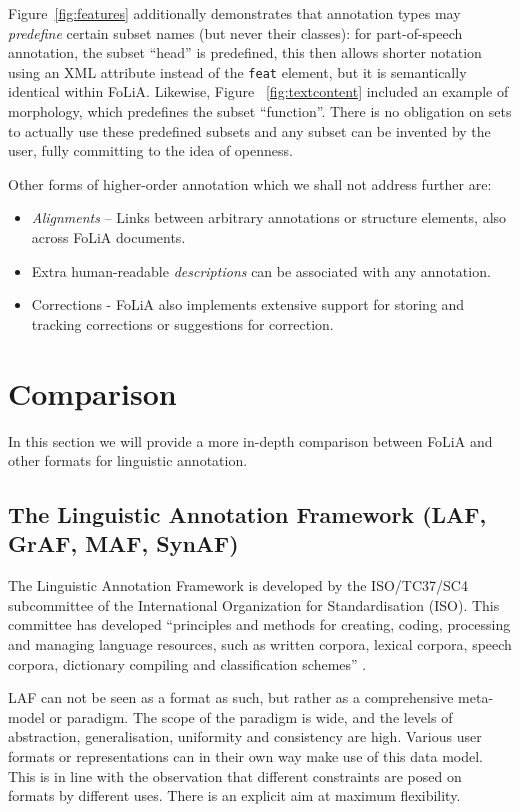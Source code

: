 \documentclass[a4paper,10pt,twoside]{article}
\begin{document}
Figure~\ref{fig:features} additionally demonstrates that annotation types may \emph{predefine} certain subset
names (but never their classes): for part-of-speech annotation, the subset ``head''
is predefined, this then allows shorter notation using an XML attribute instead
of the \texttt{feat} element, but it is semantically identical within FoLiA.  Likewise,
Figure~ \ref{fig:textcontent} included an example of morphology, which predefines
the subset ``function''. There is no obligation on sets to actually use these
predefined subsets and any subset can be invented by the user, fully committing
to the idea of openness. %

Other forms of higher-order annotation which we shall not address further are:

\begin{itemize}
  \item \emph{Alignments} -- Links \cite{XLINK} between arbitrary annotations or structure
elements, also across FoLiA documents.  
  \item Extra human-readable \emph{descriptions} can be associated with any annotation.
  \item Corrections - FoLiA also implements extensive support for storing and tracking
corrections or suggestions for correction.
\end{itemize}

\section{Comparison}
\label{sec:comparison}

In this section we will provide a more in-depth comparison between FoLiA and
other formats for linguistic annotation.

\subsection{The Linguistic Annotation Framework (LAF, GrAF, MAF, SynAF)}
\label{sec:LAF}

The Linguistic Annotation Framework is developed by the ISO/TC37/SC4
subcommittee of the International Organization for Standardisation (ISO). This
committee has developed ``principles and methods for creating, coding,
processing and managing language resources, such as written corpora, lexical
corpora, speech corpora, dictionary compiling and classification schemes''
\cite{LAF}. 

LAF can not be seen as a format as such, but rather as a comprehensive
meta-model or paradigm. The scope of the paradigm is wide, and the levels of
abstraction, generalisation, uniformity and consistency are high. Various user
formats or representations can in their own way make use of this data model.
This is in line with the observation that different constraints are posed on
formats by different uses.  There is an explicit aim at maximum flexibility. 
\end{document}
